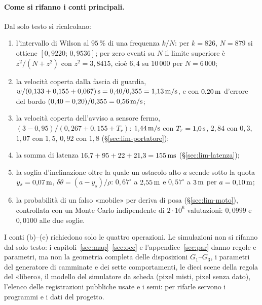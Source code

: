 \paragraph{Come si rifanno i conti principali.} Dal solo testo si ricalcolano:
\begin{enumerate}[label=(\alph*)]
\item l'intervallo di Wilson al $95\,\%$ \cite{wilson1927,brown2001} di una frequenza $k/N$: per $k=826$, $N=879$ si ottiene $[0{,}9220;\,0{,}9536]$; per zero eventi su $N$ il limite superiore è $z^2/(N+z^2)$ con $z^2=3{,}8415$, cioè $6{,}4$ su $10\,000$ per $N=6\,000$;
\item la velocità coperta dalla fascia di guardia, $w/(0{,}133+0{,}155+0{,}067)\,\mathrm{s}=0{,}40/0{,}355=1{,}13\,\mathrm{m/s}$, e con $0{,}20\,\mathrm{m}$ d'errore del bordo $(0{,}40-0{,}20)/0{,}355=0{,}56\,\mathrm{m/s}$;
\item la velocità coperta dell'avviso a sensore fermo, $(3-0{,}95)/(0{,}267+0{,}155+T_r)$: $1{,}44\,\mathrm{m/s}$ con $T_r=1{,}0\,\mathrm{s}$, $2{,}84$ con $0{,}3$, $1{,}07$ con $1{,}5$, $0{,}92$ con $1{,}8$ (\S\ref{sec:lim-portatore});
\item la somma di latenza $16{,}7+95+22+21{,}3=155\,\mathrm{ms}$ (\S\ref{sec:lim-latenza});
\item la soglia d'inclinazione oltre la quale un ostacolo alto $a$ scende sotto la quota $y_s=0{,}07\,\mathrm{m}$, $\delta\theta=(a-y_s)/\rho$: $0{,}67^\circ$ a $2{,}55\,\mathrm{m}$ e $0{,}57^\circ$ a $3\,\mathrm{m}$ per $a=0{,}10\,\mathrm{m}$;
\item la probabilità di un falso «mobile» per deriva di posa (\S\ref{sec:lim-moto}), controllata con un Monte Carlo indipendente di $2\cdot10^6$ valutazioni: $0{,}0999$ e $0{,}0100$ alle due soglie.
\end{enumerate}
I conti (b)--(e) richiedono solo le quattro operazioni. Le simulazioni non si rifanno dal solo testo: i capitoli~\ref{sec:map}--\ref{sec:occ} e l'appendice~\ref{sec:par} danno regole e parametri, ma non la geometria completa delle disposizioni $G_1$--$G_3$, i parametri del generatore di camminate e dei sette comportamenti, le dieci scene della regola del «libero», il modello del simulatore da scheda (pixel misti, pixel senza dato), l'elenco delle registrazioni pubbliche usate e i semi: per rifarle servono i programmi e i dati del progetto.


